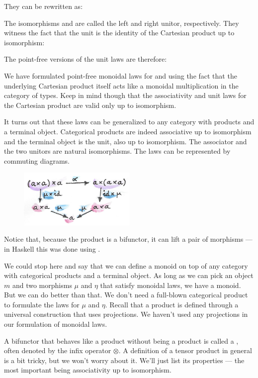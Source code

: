They can be rewritten as:

The isomorphisms  and  are called the left
and right unitor, respectively. They witness the fact that the unit
\code{()} is the identity of the Cartesian product up to isomorphism:


The point-free versions of the unit laws are therefore:

We have formulated point-free monoidal laws for  and
 using the fact that the underlying Cartesian product itself
acts like a monoidal multiplication in the category of types. Keep in
mind though that the associativity and unit laws for the Cartesian
product are valid only up to isomorphism.

It turns out that these laws can be generalized to any category with
products and a terminal object. Categorical products are indeed
associative up to isomorphism and the terminal object is the unit, also
up to isomorphism. The associator and the two unitors are natural
isomorphisms. The laws can be represented by commuting diagrams.

\begin{figure}[H]
  \centering
  \includegraphics[width=0.5\textwidth]{images/assocmon.png}
\end{figure}

\noindent
Notice that, because the product is a bifunctor, it can lift a pair of
morphisms --- in Haskell this was done using .

We could stop here and say that we can define a monoid on top of any
category with categorical products and a terminal object. As long as we
can pick an object $m$ and two morphisms $\mu$ and $\eta$ that satisfy
monoidal laws, we have a monoid. But we can do better than that. We
don't need a full-blown categorical product to formulate the laws for $\mu$
and $\eta$. Recall that a product is defined through a universal construction
that uses projections. We haven't used any projections in our
formulation of monoidal laws.

A bifunctor that behaves like a product without being a product is
called a , often denoted by the infix operator $\otimes$. A
definition of a tensor product in general is a bit tricky, but we won't
worry about it. We'll just list its properties --- the most important
being associativity up to isomorphism.

